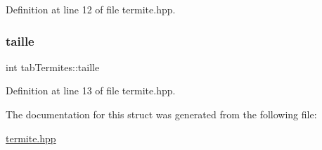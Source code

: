 Definition at line 12 of file termite.\+hpp.

\mbox{\label{structtabTermites_a0fe7fc43b7bac06c6fc7c85dd8022126}} 
\subsubsection{\texorpdfstring{taille}{taille}}
{\footnotesize\ttfamily int tab\+Termites\+::taille}



Definition at line 13 of file termite.\+hpp.



The documentation for this struct was generated from the following file\+:\begin{DoxyCompactItemize}
\item 
\hyperlink{termite_8hpp}{termite.\+hpp}\end{DoxyCompactItemize}
